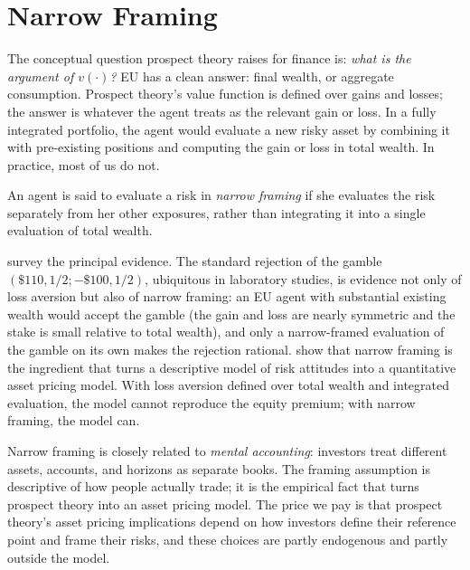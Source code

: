 \section{Narrow Framing}
\label{sec:narrow}

The conceptual question prospect theory raises for finance is: \emph{what is the argument of $v(\cdot)$?} EU has a clean answer: final wealth, or aggregate consumption. Prospect theory's value function is defined over gains and losses; the answer is whatever the agent treats as the relevant gain or loss. In a fully integrated portfolio, the agent would evaluate a new risky asset by combining it with pre-existing positions and computing the gain or loss in total wealth. In practice, most of us do not.

\begin{definition}
\label{def:narrow}
An agent is said to evaluate a risk in \emph{narrow framing} if she evaluates the risk separately from her other exposures, rather than integrating it into a single evaluation of total wealth.
\end{definition}

\citet{barberishuangthaler2006} survey the principal evidence. The standard rejection of the gamble $(\$110, 1/2; -\$100, 1/2)$, ubiquitous in laboratory studies, is evidence not only of loss aversion but also of narrow framing: an EU agent with substantial existing wealth would accept the gamble (the gain and loss are nearly symmetric and the stake is small relative to total wealth), and only a narrow-framed evaluation of the gamble on its own makes the rejection rational. \citet{barberis2001} show that narrow framing is the ingredient that turns a descriptive model of risk attitudes into a quantitative asset pricing model. With loss aversion defined over total wealth and integrated evaluation, the model cannot reproduce the equity premium; with narrow framing, the model can.

Narrow framing is closely related to \emph{mental accounting}: investors treat different assets, accounts, and horizons as separate books. The framing assumption is descriptive of how people actually trade; it is the empirical fact that turns prospect theory into an asset pricing model. The price we pay is that prospect theory's asset pricing implications depend on how investors define their reference point and frame their risks, and these choices are partly endogenous and partly outside the model.

